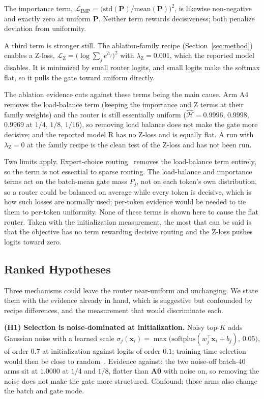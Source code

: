 \documentclass[10pt,a4paper,twocolumn,twoside]{article}
\newcommand{\bx}{\mathbf{x}}
\newcommand{\bP}{\mathbf{P}}
\newcommand{\Hs}{\hat{\mathcal{H}}}
\begin{document}
The importance term,
$\mathcal{L}_{\text{IMP}} = \bigl(\mathrm{std}(\bP)/\mathrm{mean}(\bP)\bigr)^2$, is likewise
non-negative and exactly zero at uniform $\bP$. Neither term rewards decisiveness; both
penalize deviation from uniformity.

A third term is stronger still. The ablation-family recipe (Section~\ref{sec:method}) enables a
Z-loss, $\mathcal{L}_{\text{Z}} = \bigl(\log\sum_j e^{h_j}\bigr)^2$ with
$\lambda_{\text{Z}}{=}0.001$, which the reported model disables. It is minimized by small router
logits, and small logits make the softmax flat, so it pulls the gate toward uniform directly.

The ablation evidence cuts against these terms being the main cause. Arm A4 removes the
load-balance term (keeping the importance and Z terms at their family weights) and the router is
still essentially uniform ($\Hs = 0.9996$, $0.9998$, $0.9969$ at $1/4$, $1/8$, $1/16$),
so removing load balance does not make the gate more decisive; and the reported model R has no
Z-loss and is equally flat. A run with $\lambda_{\text{Z}}{=}0$ at the family recipe is the clean
test of the Z-loss and has not been run.

Two limits apply. Expert-choice routing~\cite{zhou2022expertchoice} removes the load-balance term
entirely, so the term is not essential to sparse routing. The load-balance and importance terms act on the batch-mean gate mass $P_j$,
not on each token's own distribution, so a router could be balanced on average while every token
is decisive, which is how such losses are normally used; per-token evidence would be needed to
tie them to per-token uniformity. None of these terms is shown here to cause the flat
router. Taken with the initialization measurement, the most that can be said is that the
objective has no term rewarding decisive routing and the Z-loss pushes logits toward zero.

\subsection{Ranked Hypotheses}
\label{sec:hyp}
Three mechanisms could leave the router near-uniform and unchanging. We state them with the
evidence already in hand, which is suggestive but confounded by recipe differences, and the
measurement that would discriminate each.

\textbf{(H1) Selection is noise-dominated at initialization.} Noisy top-$K$ adds Gaussian noise
with a learned scale $\sigma_j(\bx_i) = \max\bigl(\mathrm{softplus}(w_j^\top\bx_i + b_j),\, 0.05\bigr)$, of order $0.7$
at initialization against logits of order $0.1$; training-time selection would then be close to
random~\cite{zuo2022thor}. Evidence against: the two noise-off batch-40 arms sit at $1.0000$ at $1/4$ and
$1/8$, flatter than \textbf{A0} with noise on, so removing the noise does not make the gate
more structured. Confound: those arms also change the batch and gate mode.
\end{document}

